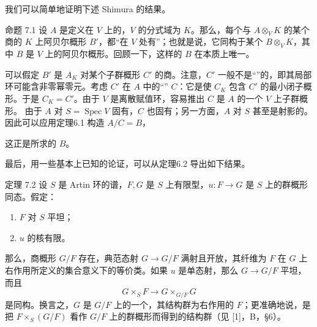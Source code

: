 我们可以简单地证明下述 Shimura 的结果。
\begin{statement}{命题 7.1}
设 $A$ 是定义在 $V$ 上的，$V$ 的分式域为 $K$。那么，每个与 $A\otimes_VK$ 的某个商的 $K$ 上阿贝尔概形 $B'$，都“在 $V$ 处有”；也就是说，它同构于某个 $B\otimes_VK$，其中 $B$ 是 $V$ 上的阿贝尔概形。回顾一下，这样的 $B$ 在本质上唯一。
\end{statement}

可以假定 $B'$ 是 $A_K$ 对某个子群概形 $C'$ 的商。注意，$C'$ 一般不是“”的，即其局部环可能含非零幂零元。考虑 $C'$ 在 $A$ 中的“” $C$：它是使 $C_K$ 包含 $C'$ 的最小闭子概形。于是 $C_K=C'$。由于 $V$ 是离散赋值环，容易推出 $C$ 是 $A$ 的一个 $V$ 上子群概形。
由于 $A$ 对 $S=\operatorname{Spec}V$ 固有，$C$ 也固有；另一方面，$A$ 对 $S$ 甚至是射影的。因此可以应用定理6.1 构造 $A/C=B$，

这正是所求的 $B$。

最后，用一些基本上已知的论证，可以从定理6.2 导出如下结果。
\begin{statement}{定理 7.2}
设 $S$ 是 Artin 环的谱，$F,G$ 是 $S$ 上有限型，$u:F\to G$ 是 $S$ 上的群概形同态。假定：
\begin{enumerate}[label=(\roman*)]
 \item $F$ 对 $S$ 平坦；
 \item $u$ 的核有限。
\end{enumerate}
那么，商概形 $G/F$ 存在，典范态射 $G\to G/F$ 满射且开放，其纤维为 $F$ 在 $G$ 上右作用所定义的集合意义下的等价类。如果 $u$ 是单态射，那么 $G\to G/F$ 平坦，而且
\[
 G\times_SF\longrightarrow G\times_{G/F}G
\]
是同构。换言之，$G$ 是 $G/F$ 上的一个，其结构群为右作用的 $F$；更准确地说，是把 $F\times_S(G/F)$ 看作 $G/F$ 上的群概形而得到的结构群（见 [1]，B，\S6）。
\end{statement}

